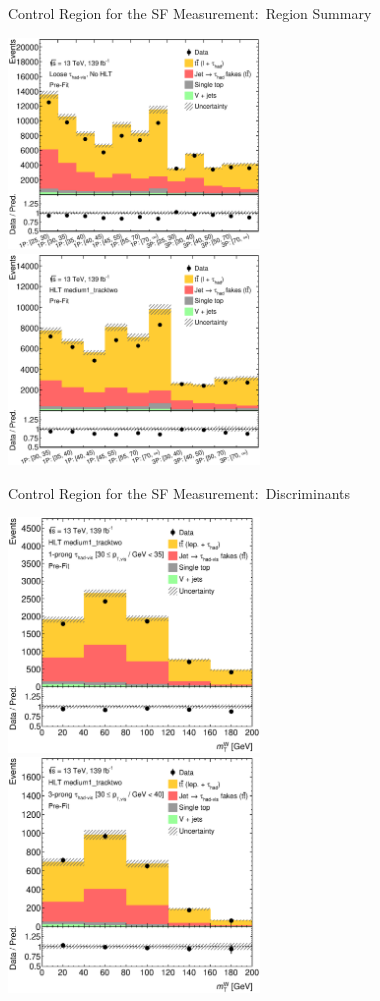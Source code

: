 \documentclass[11pt, xcolor={dvipsnames}, aspectratio=169, notes]{beamer}
\begin{document}
\begin{frame}{Control Region for the SF Measurement:\ Region Summary}
  \centering

  \includegraphics[width=0.5\textwidth]{ttbarSF/Summary_offl}%
  \includegraphics[width=0.5\textwidth]{ttbarSF/Summary_tau25}

\end{frame}


\begin{frame}{Control Region for the SF Measurement:\ Discriminants}
  \centering

  \includegraphics[width=0.5\textwidth]{ttbarSF/tau25/TauPt3035_1P}%
  \includegraphics[width=0.5\textwidth]{ttbarSF/tau25/TauPt3040_3P}

\end{frame}
\end{document}
